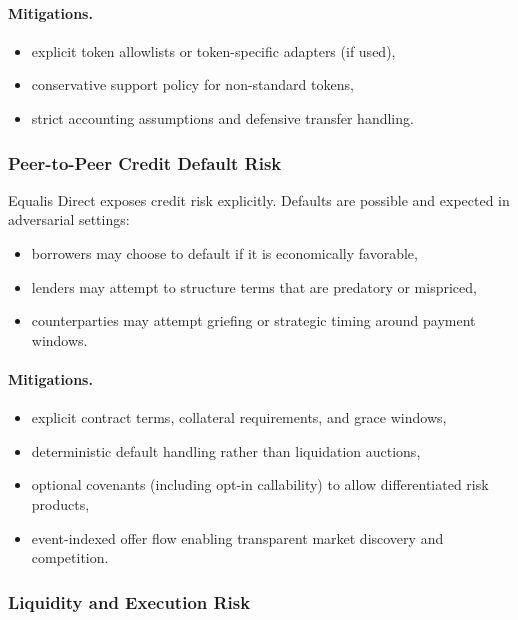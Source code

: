 \documentclass[version=preprint]{iacrcc}
\begin{document}
\paragraph{Mitigations.}
\begin{itemize}
  \item explicit token allowlists or token-specific adapters (if used),
  \item conservative support policy for non-standard tokens,
  \item strict accounting assumptions and defensive transfer handling.
\end{itemize}

\subsubsection{Peer-to-Peer Credit Default Risk}

Equalis Direct exposes credit risk explicitly. Defaults are possible and expected in adversarial settings:
\begin{itemize}
  \item borrowers may choose to default if it is economically favorable,
  \item lenders may attempt to structure terms that are predatory or mispriced,
  \item counterparties may attempt griefing or strategic timing around payment windows.
\end{itemize}

\paragraph{Mitigations.}
\begin{itemize}
  \item explicit contract terms, collateral requirements, and grace windows,
  \item deterministic default handling rather than liquidation auctions,
  \item optional covenants (including opt-in callability) to allow differentiated risk products,
  \item event-indexed offer flow enabling transparent market discovery and competition.
\end{itemize}

\subsubsection{Liquidity and Execution Risk}
\end{document}
